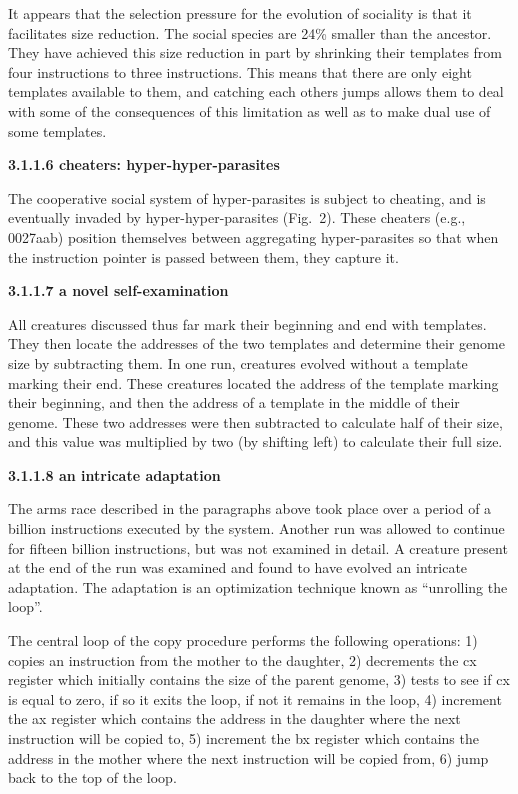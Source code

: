 It appears that the selection pressure for the evolution of sociality is that
it facilitates size reduction.  The social species are 24\% smaller than the
ancestor.  They have achieved this size reduction in part by shrinking their
templates from four instructions to three instructions.  This means that there
are only eight templates available to them, and catching each others jumps
allows them to deal with some of the consequences of this limitation as well
as to make dual use of some templates.

\LP
\bf 3.1.1.6 cheaters: hyper-hyper-parasites\rm
\eLP

The cooperative social system of hyper-parasites is subject to cheating,
and is eventually invaded by hyper-hyper-parasites (Fig.\ 2).  These cheaters
(e.g., 0027aab) position themselves between aggregating hyper-parasites so
that when the instruction pointer is passed between them, they capture it.

\LP
\bf 3.1.1.7 a novel self-examination\rm
\eLP

All creatures discussed thus far mark their beginning and end with templates.
They then locate the addresses of the two templates and determine their genome
size by subtracting them.  In one run, creatures evolved without a template
marking their end.  These creatures located the address of the template
marking their beginning, and then the address of a template in the middle of
their genome.  These two addresses were then subtracted to calculate half of
their size, and this value was multiplied by two (by shifting left) to
calculate their full size.

\LP
\bf 3.1.1.8 an intricate adaptation\rm
\eLP

The arms race described in the paragraphs above took place over a period of
a billion instructions executed by the system.  Another run was allowed to
continue for fifteen billion instructions, but was not examined in detail.
A creature present at the end of the run was examined and found to have
evolved an intricate adaptation.  The adaptation is an optimization technique
known as ``unrolling the loop''.

The central loop of the copy procedure performs the following operations:
1) copies an instruction from the mother to the daughter, 2) decrements the
cx register which initially contains the size of the parent genome, 3) tests
to see if cx is equal to zero, if so it exits the loop, if not it remains
in the loop, 4) increment the ax register which contains the address in the
daughter where the next instruction will be copied to, 5) increment the
bx register which contains the address in the mother where the next instruction
will be copied from, 6) jump back to the top of the loop.


